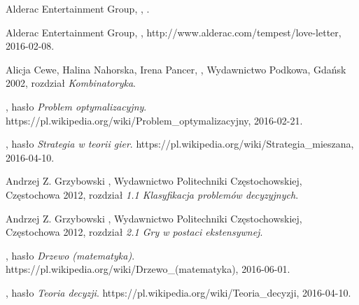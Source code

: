 \documentclass[11pt]{aghdpl}
\author{Damian Malarczyk}
\date{2016}
\begin{document}
\titlepages
\setcounter{tocdepth}{3}
\tableofcontents
\clearpage










\begin{thebibliography}{1}

\bibitem{}
\label{bib:loveLetterGame}
Alderac Entertainment Group,
,
.

\bibitem{}
\label{bib:loveLetterWebsite}
Alderac Entertainment Group,
,
\newblock http://www.alderac.com/tempest/love-letter, 2016-02-08.

\bibitem{}
\label{bib:tabliceMatematyczne}
Alicja Cewe, Halina Nahorska, Irena Pancer,
,
\newblock Wydawnictwo Podkowa, Gdańsk 2002,
\newblock rozdział {\em Kombinatoryka}.

\bibitem{}
\label{bib:wiki_ProblemOptymalizacyjny}
, hasło {\em Problem optymalizacyjny}.
\newblock https://pl.wikipedia.org/wiki/Problem\_optymalizacyjny, 2016-02-21.

\bibitem{}
\label{bib:wiki_StrategiaTeoriaGier}
, hasło {\em Strategia w teorii gier}.
\newblock https://pl.wikipedia.org/wiki/Strategia\_mieszana, 2016-04-10.

\bibitem{}
\label{bib:matematyczneModeleKonfliktu_klasyfikacja}
Andrzej Z. Grzybowski
,
\newblock Wydawnictwo Politechniki Częstochowskiej, Częstochowa 2012,
\newblock rozdział {\em 1.1 Klasyfikacja problemów decyzyjnych}.

\bibitem{}
\label{bib:matematyczneModeleKonfliktu_graEkstensywna}
Andrzej Z. Grzybowski
,
\newblock Wydawnictwo Politechniki Częstochowskiej, Częstochowa 2012,
\newblock rozdział {\em 2.1 Gry w postaci ekstensywnej}.

\bibitem{}
\label{bib:wiki_drzewo}
, hasło {\em Drzewo (matematyka)}.
\newblock https://pl.wikipedia.org/wiki/Drzewo\_(matematyka), 2016-06-01.

\bibitem{}
\label{bib:wiki_TeoriaDecyzji}
, hasło {\em Teoria decyzji}.
\newblock https://pl.wikipedia.org/wiki/Teoria\_decyzji, 2016-04-10.


\end{thebibliography}
\end{document}
